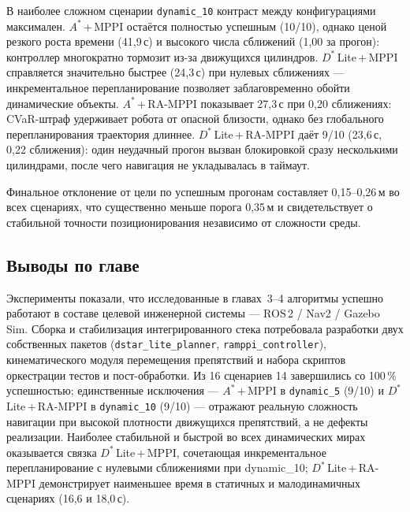\documentclass[a4paper,12pt]{extarticle}
\begin{document}
    В наиболее сложном сценарии \texttt{dynamic\_10} контраст между
    конфигурациями максимален. $A^*$\,+\,MPPI остаётся полностью
    успешным (10/10), однако ценой резкого роста времени (41{,}9\,с) и
    высокого числа сближений (1{,}00 за прогон): контроллер многократно
    тормозит из-за движущихся цилиндров. $D^*$\,Lite\,+\,MPPI
    справляется значительно быстрее (24{,}3\,с) при нулевых сближениях —
    инкрементальное перепланирование позволяет заблаговременно
    обойти динамические объекты. $A^*$\,+\,RA-MPPI показывает 27{,}3\,с
    при 0{,}20 сближениях: CVaR-штраф удерживает робота от опасной
    близости, однако без глобального перепланирования траектория длиннее.
    $D^*$\,Lite\,+\,RA-MPPI даёт 9/10 (23{,}6\,с, 0{,}22 сближения):
    один неудачный прогон вызван блокировкой сразу несколькими цилиндрами,
    после чего навигация не укладывалась в таймаут.

    Финальное отклонение от цели по успешным прогонам составляет
    0{,}15--0{,}26\,м во всех сценариях, что существенно меньше
    порога 0{,}35\,м и свидетельствует о стабильной точности
    позиционирования независимо от сложности среды.

    \subsection{Выводы по главе}

    Эксперименты показали, что исследованные в главах~3--4 алгоритмы успешно
    работают в составе целевой инженерной системы --- ROS\,2 / Nav2 / Gazebo Sim.
    Сборка и стабилизация интегрированного стека потребовала разработки
    двух собственных пакетов (\texttt{dstar\_lite\_planner},
    \texttt{ramppi\_controller}), кинематического модуля перемещения
    препятствий и набора скриптов оркестрации тестов и пост-обработки.
    Из 16 сценариев 14 завершились со 100\,\% успешностью; единственные
    исключения --- $A^*$\,+\,MPPI в \texttt{dynamic\_5} (9/10)
    и $D^*$\,Lite\,+\,RA-MPPI в \texttt{dynamic\_10} (9/10) ---
    отражают реальную сложность навигации при высокой плотности
    движущихся препятствий, а не дефекты реализации.
    Наиболее стабильной и быстрой во всех динамических мирах
    оказывается связка $D^*$\,Lite\,+\,MPPI, сочетающая инкрементальное
    перепланирование с нулевыми сближениями при dynamic\_10;
    $D^*$\,Lite\,+\,RA-MPPI демонстрирует наименьшее время в статичных
    и малодинамичных сценариях (16{,}6 и 18{,}0\,с).

    \newpage
\end{document}
